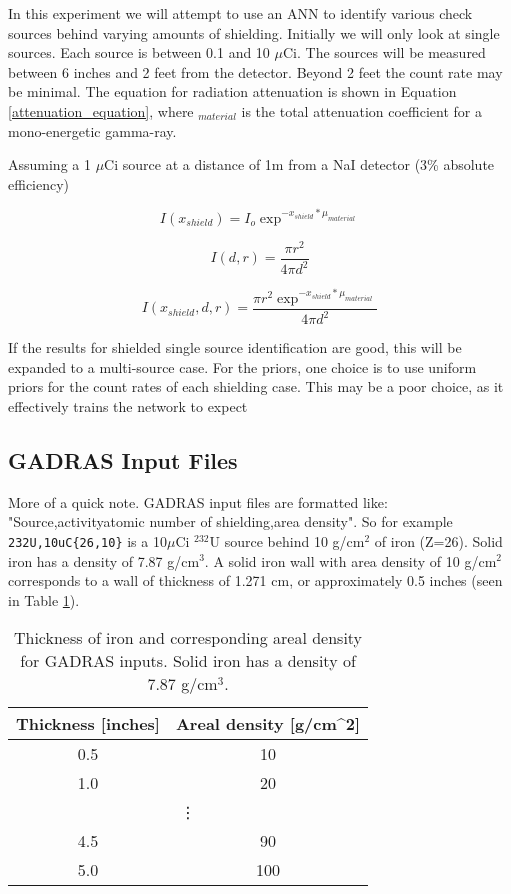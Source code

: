 \documentclass[thesis,tocnosub,noragright,centerchapter,12pt,fullpage]{uiucecethesis09}
\begin{document}
In this experiment we will attempt to use an ANN to identify various check sources behind varying amounts of shielding. Initially we will only look at single sources. Each source is between 0.1 and 10 $\mu$Ci. The sources will be measured between 6 inches and 2 feet from the detector. Beyond 2 feet the count rate may be minimal. The equation for radiation attenuation is shown in Equation \ref{attenuation_equation}, where \mu$_{material}$ is the  total attenuation coefficient for a mono-energetic gamma-ray. 

Assuming a 1 $\mu$Ci source at a distance of 1m from a NaI detector (3\% absolute efficiency)  

\begin{equation} \label{attenuation_equation}
I(x_{shield}) = I_o \exp^{-x_{shield}*\mu_{material}}
\end{equation}

\begin{equation} \label{geometric_eff}
I(d,r) = \frac{\pi r^2}{4 \pi d^2}
\end{equation}

\begin{equation} \label{total_eff}
I(x_{shield},d,r) = \frac{\pi r^2 \exp^{-x_{shield}*\mu_{material}} }{4 \pi d^2}
\end{equation}




If the results for shielded single source identification are good, this will be expanded to a multi-source case. For the priors, one choice is to use uniform priors for the count rates of each shielding case. This may be a poor choice, as it effectively trains the network to expect 

\subsection{GADRAS Input Files}

More of a quick note. GADRAS input files are formatted like: "Source,activity{atomic number of shielding,area density}". So for example \verb!232U,10uC{26,10}! is a 10$\mu$Ci $^{232}$U source behind 10 g/cm$^{2}$ of iron (Z=26).  Solid iron has a density of 7.87 g/cm$^{3}$. A solid iron wall with area density of 10 g/cm$^{2}$ corresponds to a wall of thickness of 1.271 cm, or approximately 0.5 inches (seen in Table \ref{Irontable}).


\begin{table}[]
\centering
\caption{Thickness of iron and corresponding areal density for GADRAS inputs. Solid iron has a density of 7.87 g/cm$^{3}$.}
\label{Irontable}
\begin{tabular}{|c|c|}
\hline
Thickness {[}inches{]} & Areal density {[}g/cm\textasciicircum 2{]} \\ \hline
0.5 & 10 \\ \hline
1.0 & 20 \\ \hline
\multicolumn{2}{c}{\vdots} \\ \hline
4.5 & 90 \\ \hline
5.0 & 100 \\ \hline
\end{tabular}
\end{table}
\end{document}
